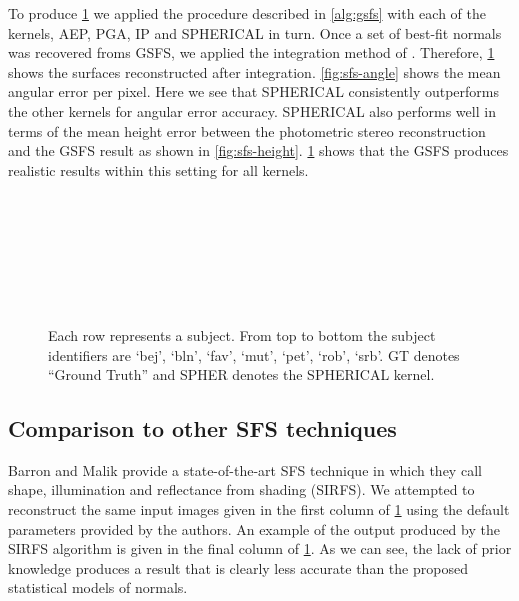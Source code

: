 To produce \cref{fig:sfs-results} we applied the procedure described in 
\cref{alg:gsfs} with each of the kernels, AEP, PGA, IP and SPHERICAL 
in turn. Once a set of best-fit normals was recovered froms GSFS, we applied 
the integration method of \citet{frankot1988method}. 
Therefore, \cref{fig:sfs-results} shows the surfaces reconstructed 
after integration. \cref{fig:sfs-angle} shows the mean angular error 
per pixel. Here we see that SPHERICAL consistently outperforms the other 
kernels for angular error accuracy. SPHERICAL also performs well in terms of 
the mean height error between the photometric stereo reconstruction and the 
GSFS result as shown in \cref{fig:sfs-height}. \cref{fig:sfs-results} 
shows that the GSFS produces realistic results within this setting for all kernels.
\begin{figure}
    \centering
     \\
     \\
     \\
     \\
     \\
     \\
    \caption{Each row represents a subject. From top to bottom the subject 
             identifiers are `bej', `bln', `fav', `mut', `pet', `rob', `srb'.
             GT denotes ``Ground Truth'' and SPHER denotes the SPHERICAL 
             kernel.}
\label{fig:sfs-results}
\end{figure}
\subsection{Comparison to other SFS techniques}\label{subsec:sfs-compare}
Barron and Malik provide a state-of-the-art SFS technique in 
\cite{barron2015shape} which they call shape, illumination and 
reflectance from shading (SIRFS). We attempted to reconstruct the same input 
images given in the first column of \cref{fig:sfs-results} using the 
default parameters provided by the authors. An example of the output produced 
by the SIRFS algorithm is given in the final column of \cref{fig:sfs-results}. 
As we can see, the lack of prior knowledge produces a result that is clearly 
less accurate than the proposed statistical models of normals.

